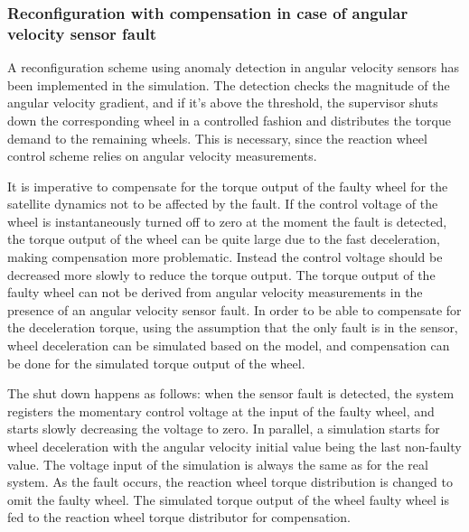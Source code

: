 \subsubsection{Reconfiguration with compensation in case of angular velocity sensor fault}

A reconfiguration scheme using anomaly detection in angular velocity sensors has been implemented in the simulation. The detection checks the magnitude of the angular velocity gradient, and if it's above the threshold, the supervisor shuts down the corresponding wheel in a controlled fashion and distributes the torque demand to the remaining wheels. This is necessary, since the reaction wheel control scheme relies on angular velocity measurements. 

It is imperative to compensate for the torque output of the faulty wheel for the satellite dynamics not to be affected by the fault. If the control voltage of the wheel is instantaneously turned off to zero at the moment the fault is detected, the torque output of the wheel can be quite large due to the fast deceleration, making compensation more problematic. Instead the control voltage should be decreased more slowly to reduce the torque output. The torque output of the faulty wheel can not be derived from angular velocity measurements in the presence of an angular velocity sensor fault. In order to be able to compensate for the deceleration torque, using the assumption that the only fault is in the sensor, wheel deceleration can be simulated based on the model, and compensation can be done for the simulated torque output of the wheel.

The shut down happens as follows: when the sensor fault is detected, the system registers the momentary control voltage at the input of the faulty wheel, and starts slowly decreasing the voltage to zero. In parallel, a simulation starts for wheel deceleration with the angular velocity initial value being the last non-faulty value. The voltage input of the simulation is always the same as for the real system. As the fault occurs, the reaction wheel torque distribution is changed to omit the faulty wheel. The simulated torque output of the wheel faulty wheel is fed to the reaction wheel torque distributor for compensation.

